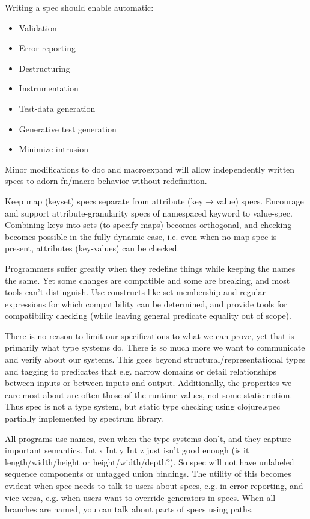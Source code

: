 Writing a spec should enable automatic:

\begin{itemize}
\item Validation
\item Error reporting
\item Destructuring
\item Instrumentation
\item Test-data generation
\item Generative test generation
\item Minimize intrusion
\end{itemize}

Minor modifications to doc and macroexpand will allow independently written
specs to adorn fn/macro behavior without redefinition.

Keep map (keyset) specs separate from attribute (key$\rightarrow$value) specs.
Encourage and support attribute-granularity specs of namespaced keyword to
value-spec. Combining keys into sets (to specify maps) becomes orthogonal, and
checking becomes possible in the fully-dynamic case, i.e. even when no map spec
is present, attributes (key-values) can be checked.

Programmers suffer greatly when they redefine things while keeping the names the
same. Yet some changes are compatible and some are breaking, and most tools
can’t distinguish. Use constructs like set membership and regular expressions
for which compatibility can be determined, and provide tools for compatibility
checking (while leaving general predicate equality out of scope).

There is no reason to limit our specifications to what we can prove, yet that is
primarily what type systems do. There is so much more we want to communicate and
verify about our systems. This goes beyond structural/representational types and
tagging to predicates that e.g. narrow domains or detail relationships between
inputs or between inputs and output. Additionally, the properties we care most
about are often those of the runtime values, not some static notion. Thus spec
is not a type system, but static type checking using clojure.spec partially
implemented by spectrum library.


All programs use names, even when the type systems don’t, and they capture
important semantics. Int x Int y Int z just isn’t good enough (is it
length/width/height or height/width/depth?). So spec will not have unlabeled
sequence components or untagged union bindings. The utility of this becomes
evident when spec needs to talk to users about specs, e.g. in error reporting,
and vice versa, e.g. when users want to override generators in specs. When all
branches are named, you can talk about parts of specs using paths.

